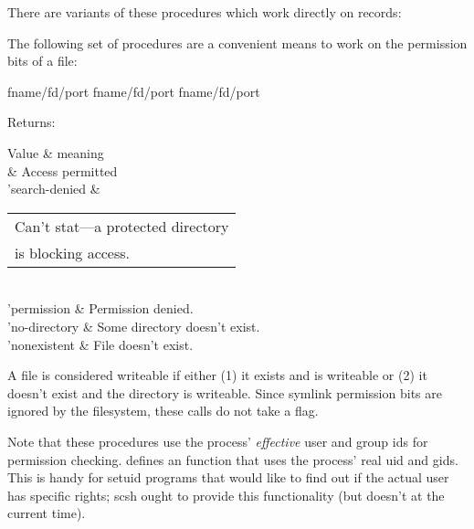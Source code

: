 There are variants of these procedures which work directly on
 records:

The following set of procedures are a convenient means to work on the
permission bits of a file:

  {fname/fd/port} \boolean
{}  {fname/fd/port} \boolean
{} {fname/fd/port} \boolean
\begin{desc}
    Returns:
    \begin{optiontable}
        \textnormal{Value}      & meaning \\ \hline
        \sharpf                 & Access permitted \\
        'search-denied          & {\renewcommand{\arraystretch}{1}%
                                   \begin{tabular}[t]{@{}l@{}}
                                     Can't stat---a protected directory \\
                                     is blocking access.\end{tabular}} \\
        'permission             & Permission denied. \\
        'no-directory           & Some directory doesn't exist. \\
        'nonexistent            & File doesn't exist.
    \end{optiontable}
%
    A file is considered writeable if either (1) it exists and is writeable
    or (2) it doesn't exist and the directory is writeable.
    Since symlink permission bits are ignored by the filesystem, these
    calls do not take a  flag.

    Note that these procedures use the process' \emph{effective} user
    and group ids for permission checking. {\Posix} defines an 
    function that uses the process' real uid and gids. This is handy
    for setuid programs that would like to find out if the actual user
    has specific rights; scsh ought to provide this functionality (but doesn't
    at the current time). 


\end{desc}
